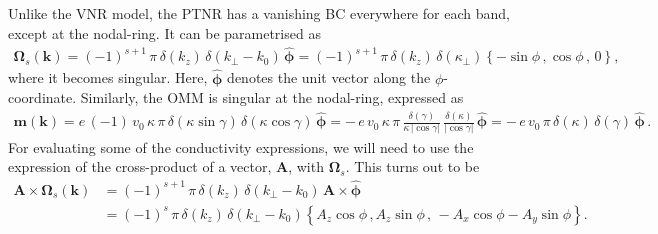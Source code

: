 \documentclass[aps,prb,onecolumn,nofootinbib,citeautoscript,10pt]{revtex4-2}
\newcommand{\bs}[1]{\boldsymbol{#1}}
\def \nn{\nonumber \\}
\begin{document}
Unlike the VNR model, the PTNR has a vanishing BC everywhere for each band, except at the nodal-ring. It can be parametrised as \cite{schnyder_nodal, fuchs-bc-graphene}
\begin{align}
\label{eqbcpnr}
\bs \Omega_s ({ \bs k})
= (-1)^{s+1}\, \pi \, \delta(k_z)\,\delta(k_\perp-k_0)\,{\boldsymbol{\hat \phi}}
= (-1)^{s+1} \,\pi \, \delta(k_z)\,\delta(\kappa_\perp)
\left \lbrace - \sin \phi\,, \cos \phi\,, \, 0 \right \rbrace ,
\end{align}
where it becomes singular. Here, ${\boldsymbol{\hat \phi}}$ denotes the unit vector along the $\phi$-coordinate.
Similarly, the OMM is singular at the nodal-ring, expressed as
\begin{align} 
\bs{m} ( \bs k)  = e\,(-1)\, v_0\, \kappa \, \pi\, \delta(\kappa \sin \gamma)\,\delta(\kappa  \cos \gamma)
\,{\boldsymbol{\hat \phi}}
=-\, e\, v_0\, \kappa \, \pi\, \frac{\delta(\gamma)} {\kappa \,|\cos \gamma|}
\,\frac{\delta(\kappa )} {|\cos \gamma|}
\,{\boldsymbol{\hat \phi}}
= -\, e\,   v_0  \,\pi \, \delta(\kappa)\,\delta(\gamma) \,{\boldsymbol{\hat \phi}}\,.
\end{align}
For evaluating some of the conductivity expressions, we will need to use the expression of the cross-product of a vector, $\bs A$, with $\bs \Omega_s$. This turns out to be
\begin{align}
\label{eqcross}
 \bs A \times \bs \Omega_s ({ \bs k})
 & =  (-1)^{s+1} \,\pi \, \delta(k_z)\,\delta(k_\perp-k_0)\,
\bs A \times {\boldsymbol{\hat \phi}}
\nn & = (-1)^s\, \pi \, \delta(k_z)\,\delta(k_\perp-k_0)
\left \lbrace  A_z \cos \phi\,,  A_z \sin \phi\,, \, 
-A_x \cos \phi - A_y \sin \phi \right \rbrace .
\end{align}
\end{document}
